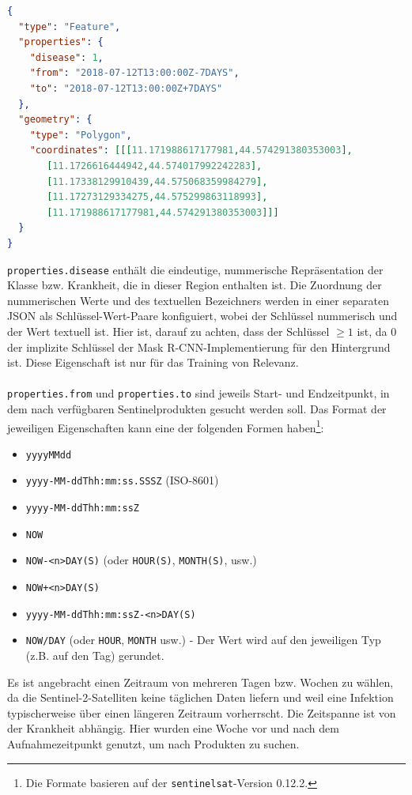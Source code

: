 \begin{lstlisting}[language=json,caption={Annotation},captionpos=b]
{
  "type": "Feature",
  "properties": {
    "disease": 1,
    "from": "2018-07-12T13:00:00Z-7DAYS",
    "to": "2018-07-12T13:00:00Z+7DAYS"
  },
  "geometry": {
    "type": "Polygon",
    "coordinates": [[[11.171988617177981,44.574291380353003],
       [11.1726616444942,44.574017992242283],
       [11.17338129910439,44.575068359984279],
       [11.17273129334275,44.575299863118993],
       [11.171988617177981,44.574291380353003]]]
  }
}
\end{lstlisting}
\noindent
\texttt{properties.disease} enthält die eindeutige, nummerische Repräsentation der Klasse bzw. Krankheit, die in dieser Region enthalten ist. Die Zuordnung der nummerischen Werte und des textuellen Bezeichners werden in einer separaten JSON als Schlüssel-Wert-Paare konfiguiert, wobei der Schlüssel nummerisch und der Wert textuell ist. Hier ist, darauf zu achten, dass der Schlüssel $\ge1$ ist, da $0$ der implizite Schlüssel der Mask R-CNN-Implementierung für den Hintergrund ist. Diese Eigenschaft ist nur für das Training von Relevanz.
\\\\
\texttt{properties.from} und \texttt{properties.to} sind jeweils Start- und Endzeitpunkt, in dem nach verfügbaren Sentinelprodukten gesucht werden soll. Das Format der jeweiligen Eigenschaften kann eine der folgenden Formen haben\footnote{Die Formate basieren auf der \texttt{sentinelsat}-Version 0.12.2.}:
\begin{itemize}
	\item \texttt{yyyyMMdd}
	\item \texttt{yyyy-MM-ddThh:mm:ss.SSSZ} (ISO-8601)
	\item \texttt{yyyy-MM-ddThh:mm:ssZ}
	\item \texttt{NOW}
	\item \texttt{NOW-<n>DAY(S)} (oder \texttt{HOUR(S)}, \texttt{MONTH(S)}, usw.)
	\item \texttt{NOW+<n>DAY(S)}
	\item \texttt{yyyy-MM-ddThh:mm:ssZ-<n>DAY(S)}
	\item \texttt{NOW/DAY} (oder \texttt{HOUR}, \texttt{MONTH} usw.) - Der Wert wird auf den jeweiligen Typ (z.B. auf den Tag) gerundet.
\end{itemize}
\noindent
Es ist angebracht einen Zeitraum von mehreren Tagen bzw. Wochen zu wählen, da die Sentinel-2-Satelliten keine täglichen Daten liefern und weil eine Infektion typischerweise über einen längeren Zeitraum vorherrscht. Die Zeitspanne ist von der Krankheit abhängig. Hier wurden eine Woche vor und nach dem Aufnahmezeitpunkt genutzt, um nach Produkten zu suchen.

